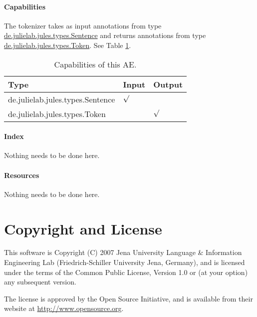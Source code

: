 \documentclass[11pt,a4paper,halfparskip]{scrartcl}
\begin{document}
\paragraph{Capabilities}
\label{sss:capabilities}
The tokenizer takes as input annotations from type \url{de.julielab.jules.types.Sentence} and returns annotations from type \url{de.julielab.jules.types.Token}. See Table \ref{tab:capabilities}.
\begin{table}[h!]
  \centering
  \begin{tabular}{|p{5cm}|p{2cm}|p{2cm}|}
    \hline
    Type & Input & Output \\
    \hline\hline
     de.julielab.jules.types.Sentence & $\surd$ & \\
      \hline
     de.julielab.jules.types.Token & &  $\surd$  \\
      \hline
  \end{tabular}
  \caption{Capabilities of this AE.}
  \label{tab:capabilities}
\end{table} 


\paragraph{Index}
Nothing needs to be done here.

\paragraph{Resources}
Nothing needs to be done here.


\section{Copyright and License}
This software is Copyright (C) 2007 Jena University Language \& Information
Engineering Lab (Friedrich-Schiller University Jena, Germany), and is
licensed under the terms of the Common Public License, Version 1.0 or (at
your option) any subsequent version.

The license is approved by the Open Source Initiative, and is
available from their website at \url{http://www.opensource.org}.



\end{document}
